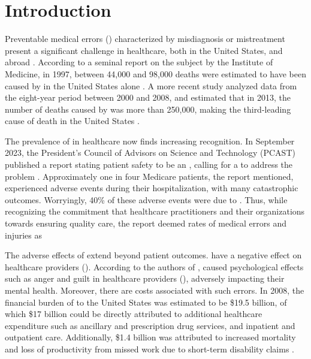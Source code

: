 \chapter{Introduction}\label{chapter:introduction}

Preventable medical errors (\PMEs{}) characterized by misdiagnosis or mistreatment present
a significant challenge in healthcare, both in the United States, and abroad \cite{RodziewiczStatsPearls18}.
According to a seminal report on the subject by the Institute of Medicine, in 1997,
between 44,000 and 98,000 deaths were estimated to have been caused by \PMEs{} in
the United States alone \cite{DonaldsonBook00}.
A more recent study analyzed data from the eight-year
period between 2000 and 2008, and estimated that in 2013, the number of deaths
caused by \PMEs{} was more than 250,000, making \PMEs{} the third-leading
cause of death in the United States \cite{MakaryBMJ16}.

The prevalence of \PMEs{} in healthcare now finds increasing recognition.
In September 2023, the President's Council of Advisors on Science and
Technology (PCAST) published a report stating
patient safety to be an , calling
for a  to address the problem \cite{PCAST23}.
Approximately one in four Medicare
patients, the report mentioned, experienced adverse events during their hospitalization, with
many catastrophic outcomes. Worryingly, 40\% of these adverse events were
due to \PMEs{}. Thus, while recognizing the commitment that
healthcare practitioners and their organizations towards ensuring quality
care, the report deemed rates of medical errors and injuries as 

The adverse effects of \PMEs{} extend beyond patient outcomes.
\PMEs{} have a negative effect on healthcare providers (\HCPs). According to the authors of
\cite{RodziewiczStatsPearls18}, \PMEs{} caused psychological effects such
as anger and guilt in healthcare providers (\HCPs{}), adversely impacting their mental
health. Moreover, there are costs associated with such errors.
In 2008, the financial burden of \PMEs{} to the United States was
estimated to be \$19.5 billion, of which \$17 billion could be
directly attributed to additional healthcare expenditure such as
ancillary and prescription drug services, and inpatient and outpatient care.
Additionally, \$1.4 billion was attributed to increased mortality and loss
of productivity from missed work due to short-term disability claims \cite{AndelJHCF12}.

